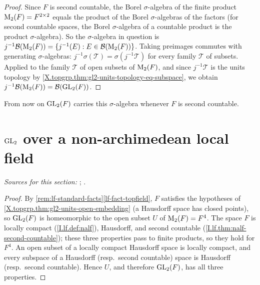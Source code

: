 \begin{theorem}
\end{theorem}
\begin{proof}
Since $F$ is second countable, the Borel $\sigma$-algebra of the finite product $\mathrm{M}_2(F)=F^{2\times2}$ equals
the product of the Borel $\sigma$-algebras of the factors (for second countable spaces, the Borel $\sigma$-algebra of
a countable product is the product $\sigma$-algebra). So the $\sigma$-algebra in question is
$j^{-1}\mathcal B(\mathrm{M}_2(F))=\{j^{-1}(E):E\in\mathcal B(\mathrm{M}_2(F))\}$. Taking preimages commutes with generating
$\sigma$-algebras: $j^{-1}\sigma(\mathcal T)=\sigma(j^{-1}\mathcal T)$ for every family $\mathcal T$ of subsets.
Applied to the family $\mathcal T$ of open subsets of $\mathrm{M}_2(F)$, and since $j^{-1}\mathcal T$ is the units topology
by \cref{X.topgrp.thm:gl2-units-topology-eq-subspace}, we obtain $j^{-1}\mathcal B(\mathrm{M}_2(F))=\mathcal B(\mathrm{GL}_2(F))$.
\end{proof}
\noindent From now on $\mathrm{GL}_2(F)$ carries this $\sigma$-algebra whenever $F$ is second countable.

\section{\texorpdfstring{$\mathrm{GL}_2$ over a non-archimedean local field}{GL₂ over a non-archimedean local field}}\label{sec:topgrp-nalf}

\noindent\emph{Sources for this section:} \cite[§9.1]{Cas-p}; \cite[§1]{Corv-ptIII-1}.

\begin{theorem}
\end{theorem}
\begin{proof}
By \cref{rem:lf-standard-facts}\ref{lf-fact-topfield}, $F$ satisfies the hypotheses of
\cref{X.topgrp.thm:gl2-units-open-embedding} (a Hausdorff space has closed points), so $\mathrm{GL}_2(F)$ is homeomorphic to
the open subset $U$ of $\mathrm{M}_2(F)=F^4$. The space $F$ is locally compact (\cref{I.lf.def:nalf}), Hausdorff, and second
countable (\cref{I.lf.thm:nalf-second-countable}); these three properties pass to finite products, so they hold for
$F^4$. An open subset of a locally compact Hausdorff space is locally compact, and every subspace of a Hausdorff
(resp.\ second countable) space is Hausdorff (resp.\ second countable). Hence $U$, and therefore $\mathrm{GL}_2(F)$, has all
three properties.
\end{proof}

